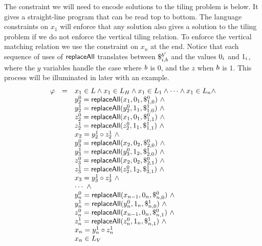 \documentclass{article}
\newcommand{\concat} {\circ}
\begin{document}
The constraint we will need to encode solutions to the tiling problem is below.
It gives a straight-line program that can be read top to bottom.
The language constraints on $x_1$ will enforce that any solution also gives a solution to the tiling problem if we do not enforce the vertical tiling relation.
To enforce the vertical matching relation we use the constraint on $x_n$ at the end.
Notice that each sequence of uses of $\replaceall$ translates between
$\repl{i}{\bit}{\bit'}$
and the values $\nbit{i}{0}$ and $\nbit{i}{1}$, where the $y$ variables handle the case where $\bit$ is $0$, and the $z$ when $\bit$ is $1$.
This process will be illuminated in later with an example.
\[
    \begin{array}{rcl}
        \varphi &=& x_1 \in L \land
                    x_1 \in L_\hcons \land
                    x_1 \in L_1 \land
                    \cdots \land
                    x_1 \in L_n \land \\
                & & y^0_2 = \replaceall(x_1, \nbit{1}{0}, \repl{1}{0}{0}) \ \land \\
                & & y^1_2 = \replaceall(y^0_2, \nbit{1}{1}, \repl{1}{0}{1}) \ \land \\
                & & z^0_2 = \replaceall(x_1, \nbit{1}{0}, \repl{1}{1}{0}) \ \land \\
                & & z^1_2 = \replaceall(z^0_2, \nbit{1}{1}, \repl{1}{1}{1}) \ \land \\
                & & x_2 = y^1_2 \concat z^1_2 \ \land \\
                & & y^0_3 = \replaceall(x_2, \nbit{2}{0}, \repl{2}{0}{0}) \ \land \\
                & & y^1_3 = \replaceall(y^0_3, \nbit{2}{1}, \repl{2}{0}{1}) \ \land \\
                & & z^0_3 = \replaceall(x_2, \nbit{2}{0}, \repl{2}{1}{0}) \ \land \\
                & & z^1_3 = \replaceall(z^0_2, \nbit{2}{1}, \repl{2}{1}{1}) \ \land \\
                & & x_3 = y^1_3 \concat z^1_3 \ \land \\
                & & \cdots \ \land \\
                & & y^0_n = \replaceall(x_{n-1}, \nbit{n}{0}, \repl{n}{0}{0}) \ \land \\
                & & y^1_n = \replaceall(y^0_n, \nbit{n}{1}, \repl{n}{0}{1}) \ \land \\
                & & z^0_n = \replaceall(x_{n-1}, \nbit{n}{0}, \repl{n}{1}{0}) \ \land \\
                & & z^1_n = \replaceall(z^0_n, \nbit{n}{1}, \repl{n}{1}{1}) \ \land \\
                & & x_n = y^1_n \concat z^1_n \\

                & & x_n \in L_\vcons
    \end{array}
\]
\end{document}
